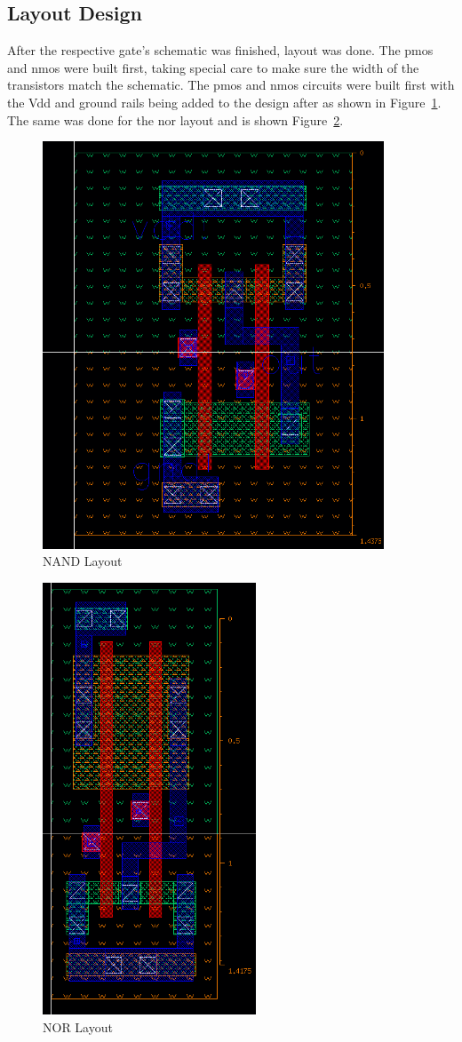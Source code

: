 \documentclass[12pt]{article}
\begin{document}
\subsection{Layout Design}
After the respective gate's schematic was finished, layout was done. The pmos and nmos were built first, taking special care to make sure the width of the
transistors match the schematic. The pmos and nmos circuits were built first with the Vdd and ground rails being added to the design after as shown in Figure~\ref{fig:nand_layout}.
The same was done for the nor layout and is shown Figure~\ref{fig:nor_layout}.
\begin{figure}[!htb]
  \centering
  \includegraphics[width=4in,angle=90]{figures/nand/nand_layout.png}
  \caption{NAND Layout}\label{fig:nand_layout}
\end{figure}
\begin{figure}[!htb]
  \centering
  \includegraphics[width=2.5in,angle=90]{figures/nor/nor_layout.png}
  \caption{NOR Layout}\label{fig:nor_layout}
\end{figure}
\end{document}
